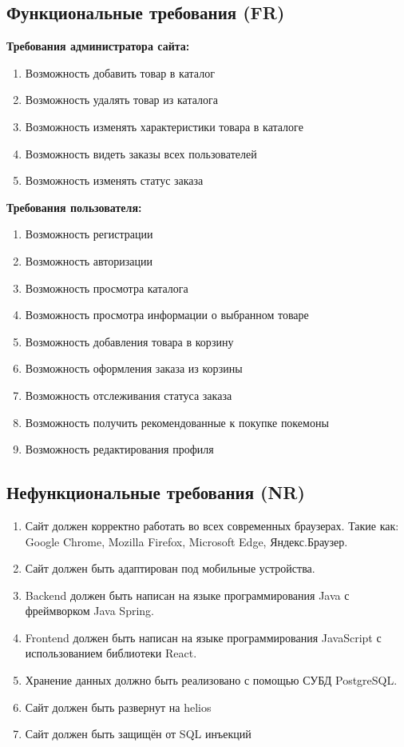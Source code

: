 \documentclass[12pt,onecolumn]{article}
\begin{document}
\subsection{Функциональные требования (FR)}
\textbf{Требования администратора сайта:}
\begin{enumerate}
  \item Возможность добавить товар в каталог
  \item Возможность удалять товар из каталога
  \item Возможность изменять характеристики товара в каталоге
  \item Возможность видеть заказы всех пользователей
  \item Возможность изменять статус заказа
\end{enumerate}
\textbf{Требования пользователя:}
\begin{enumerate}
  \item Возможность регистрации
  \item Возможность авторизации
  \item Возможность просмотра каталога
  \item Возможность просмотра информации о выбранном товаре
  \item Возможность добавления товара в корзину
  \item Возможность оформления заказа из корзины
  \item Возможность отслеживания статуса заказа
  \item Возможность получить рекомендованные к покупке покемоны
  \item Возможность редактирования профиля
\end{enumerate}
\subsection{Нефункциональные требования (NR)}
\begin{enumerate}
  \item Сайт должен корректно работать во всех современных браузерах. Такие как:
  Google Chrome, Mozilla Firefox, Microsoft Edge, Яндекс.Браузер.
  \item Сайт должен быть адаптирован под мобильные устройства.
  \item Backend должен быть написан на языке программирования Java с фреймворком Java Spring.
  \item Frontend должен быть написан на языке программирования JavaScript с использованием библиотеки React.
  \item Хранение данных должно быть реализовано с помощью СУБД PostgreSQL.
  \item Сайт должен быть развернут на helios
  \item Сайт должен быть защищён от SQL инъекций
\end{enumerate}
\end{document}
